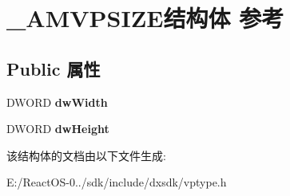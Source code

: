 \hypertarget{struct___a_m_v_p_s_i_z_e}{}\section{\+\_\+\+A\+M\+V\+P\+S\+I\+Z\+E结构体 参考}
\label{struct___a_m_v_p_s_i_z_e}
\subsection*{Public 属性}
\begin{DoxyCompactItemize}
\item 
\mbox{\label{struct___a_m_v_p_s_i_z_e_a46bb0c5ff3cd56fbbaad0802fb5365ff}} 
D\+W\+O\+RD {\bfseries dw\+Width}
\item 
\mbox{\label{struct___a_m_v_p_s_i_z_e_a7b7b9f59d334e13cb94d7ffcfeb7684a}} 
D\+W\+O\+RD {\bfseries dw\+Height}
\end{DoxyCompactItemize}


该结构体的文档由以下文件生成\+:\begin{DoxyCompactItemize}
\item 
E\+:/\+React\+O\+S-\/0../sdk/include/dxsdk/vptype.\+h\end{DoxyCompactItemize}

